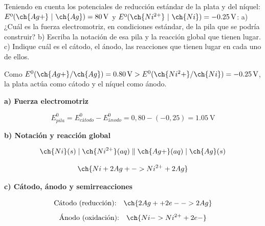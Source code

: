 \begin{exerciseEVAU}
    Teniendo en cuenta los potenciales de reducción estándar de la plata y del níquel: \( E\text{º}(\ch{Ag+}\ |\ \ch{Ag}) = \SI{+80}{\volt} \) y \( E\text{º}(\ch{Ni^{2+}}\ |\  \ch{Ni}) = \SI{-0.25}{\volt} \): a) ¿Cuál es la fuerza electromotriz, en condiciones estándar, de la pila que se podría construir? b) Escriba la notación de esa pila y la reacción global que tienen lugar. c) Indique cuál es el cátodo, el ánodo, las reacciones que tienen lugar en cada uno de ellos.

    \begin{solu}


        Como \(E^0(\ch{Ag+}/\ch{Ag}) = \SI{0.80}{\volt} > E^0(\ch{Ni^2+}/\ch{Ni}) = \SI{-0.25}{\volt}\), la plata actúa como cátodo y el níquel como ánodo.

        \textbf{a) Fuerza electromotriz}

        \begin{equation*}
            E^0_{pila} = E^0_{cátodo} - E^0_{ánodo} = 0,80-(-0,25) = \SI{1.05}{\volt}
        \end{equation*}

        \textbf{b) Notación y reacción global}

        \begin{equation*}
            \ch{Ni}(s) \mid \ch{Ni^{2+}}(aq) \parallel \ch{Ag+}(aq) \mid \ch{Ag}(s)
        \end{equation*}

        \begin{equation*}
            \ch{Ni + 2 Ag+ -> Ni^{2+} + 2 Ag}
        \end{equation*}

        \textbf{c) Cátodo, ánodo y semirreacciones}

        \begin{equation*}
            \text{Cátodo (reducción):} \quad \ch{2 Ag+ + 2 e- -> 2 Ag}
        \end{equation*}
        \begin{equation*}
            \text{Ánodo (oxidación):} \quad \ch{Ni -> Ni^{2+} + 2 e-}
        \end{equation*}

    \end{solu}
\end{exerciseEVAU}


